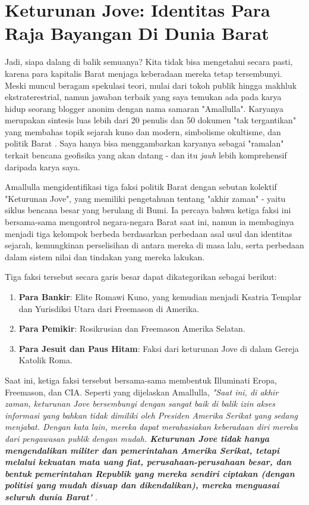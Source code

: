 \documentclass[10pt,twocolumn,letterpaper]{article}
\begin{document}
\section{Keturunan Jove: Identitas Para Raja Bayangan Di Dunia Barat}

Jadi, siapa dalang di balik semuanya? Kita tidak bisa mengetahui secara pasti, karena para kapitalis Barat menjaga keberadaan mereka tetap tersembunyi. Meski muncul beragam spekulasi teori, mulai dari tokoh publik hingga makhluk ekstraterestrial, namun jawaban terbaik yang saya temukan ada pada karya hidup seorang blogger anonim dengan nama samaran "Amallulla". Karyanya merupakan sintesis luas lebih dari 20 penulis dan 50 dokumen "tak tergantikan" yang membahas topik sejarah kuno dan modern, simbolisme okultisme, dan politik Barat \cite{33,34}. Saya hanya bisa menggambarkan karyanya sebagai "ramalan" terkait bencana geofisika yang akan datang - dan itu \textit{jauh} lebih komprehensif daripada karya saya.

Amallulla mengidentifikasi tiga faksi politik Barat dengan sebutan kolektif "Keturunan Jove", yang memiliki pengetahuan tentang "akhir zaman" - yaitu siklus bencana besar yang berulang di Bumi. Ia percaya bahwa ketiga faksi ini bersama-sama mengontrol negara-negara Barat saat ini, namun ia membaginya menjadi tiga kelompok berbeda berdasarkan perbedaan asal usul dan identitas sejarah, kemungkinan perselisihan di antara mereka di masa lalu, serta perbedaan dalam sistem nilai dan tindakan yang mereka lakukan.

Tiga faksi tersebut secara garis besar dapat dikategorikan sebagai berikut:

\begin{flushleft}
\begin{enumerate}
    \item \textbf{Para Bankir}: Elite Romawi Kuno, yang kemudian menjadi Ksatria Templar dan Yurisdiksi Utara dari Freemason di Amerika.
    \item \textbf{Para Pemikir}: Rosikrusian dan Freemason Amerika Selatan.
    \item \textbf{Para Jesuit dan Paus Hitam}: Faksi dari keturunan Jove di dalam Gereja Katolik Roma.
\end{enumerate}
\end{flushleft}

Saat ini, ketiga faksi tersebut bersama-sama membentuk Illuminati Eropa, Freemason, dan CIA. Seperti yang dijelaskan Amallulla, \textit{"Saat ini, di akhir zaman, keturunan Jove bersembunyi dengan sangat baik di balik izin akses informasi yang bahkan tidak dimiliki oleh Presiden Amerika Serikat yang sedang menjabat. Dengan kata lain, mereka dapat merahasiakan keberadaan diri mereka dari pengawasan publik dengan mudah. \textbf{Keturunan Jove tidak hanya mengendalikan militer dan pemerintahan Amerika Serikat, tetapi melalui kekuatan mata uang fiat, perusahaan-perusahaan besar, dan bentuk pemerintahan Republik yang mereka sendiri ciptakan (dengan politisi yang mudah disuap dan dikendalikan), mereka menguasai seluruh dunia Barat}"} \cite{33,34}.
\end{document}

